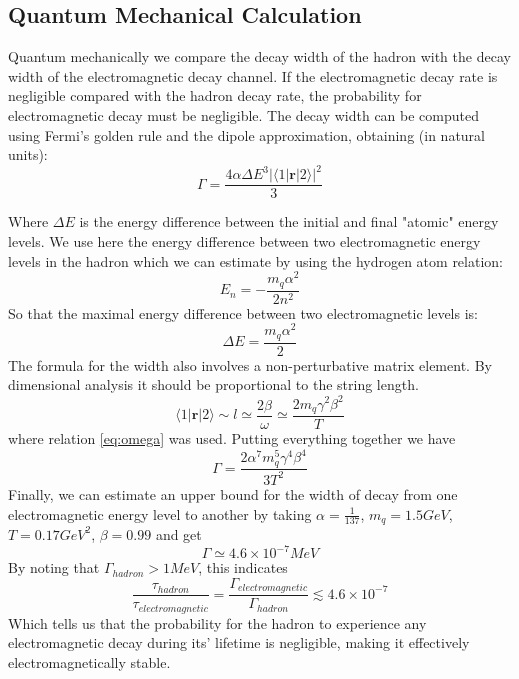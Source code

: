 \documentclass[11pt,a4paper]{article}
\begin{document}
\subsection{Quantum Mechanical Calculation}

Quantum mechanically we compare the decay width of the hadron with the decay width of the electromagnetic decay channel. If the electromagnetic decay rate is negligible compared with the hadron decay rate, the probability for electromagnetic decay must be negligible. The decay width can be computed using Fermi's golden rule and the dipole approximation, obtaining (in natural units):\cite{Scully97}
\begin{equation}
\Gamma=\frac{4\alpha\Delta E^3\vert\langle 1\vert \textbf{r} \vert 2\rangle\vert^2}{3}
\end{equation}

Where $\Delta E$ is the energy difference between the initial and final "atomic" energy levels. We use here the energy difference between two electromagnetic energy levels in the hadron which we can estimate by using the hydrogen atom relation:
\begin{equation}
E_n=-\frac{m_q \alpha^2}{2n^2}
\end{equation}
So that the maximal energy difference between two electromagnetic levels is:
\begin{equation}
\Delta E=\frac{m_q \alpha^2}{2}
\end{equation}
The formula for the width also involves a non-perturbative matrix element. By dimensional analysis it should be proportional to the string length.
\begin{equation}
\langle 1\vert \textbf{r} \vert 2\rangle\sim l\simeq \frac{2\beta}{\omega} \simeq \frac{2m_q \gamma^2\beta^2}{T}
\end{equation}
where relation \ref{eq:omega} was used. Putting everything together we have
\begin{equation}
\Gamma=\frac{2\alpha^7 m_q^5 \gamma^4\beta^4}{3T^2}
\end{equation}
Finally, we can estimate an upper bound for the width of decay from one electromagnetic energy level to another by taking $\alpha=\frac{1}{137}$, $m_q=1.5 GeV$, $T=0.17 GeV^2$, $\beta=0.99$ and get
\begin{equation}
\Gamma\simeq 4.6\times 10^{-7} MeV
\end{equation}
By noting that $\Gamma_{hadron}>1 MeV$, this indicates
\begin{equation}
\frac{\tau_{hadron}}{\tau_{electromagnetic}}=\frac{\Gamma_{electromagnetic}}{\Gamma_{hadron}}\lesssim 4.6\times 10^{-7}
\end{equation}
Which tells us that the probability for the hadron to experience any electromagnetic decay during its' lifetime is negligible, making it effectively electromagnetically stable.
\end{document}
